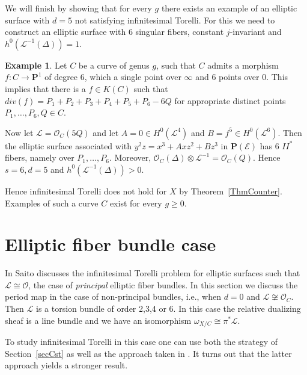 \documentclass{amsart}
\newcommand{\Ps}{\mathbf{P}}
\newcommand{\cL}{\mathcal{L}}
\newcommand{\cO}{\mathcal{O}}
\newcommand{\cE}{\mathcal{E}}
\theoremstyle{definition}
\newtheorem{example}[theorem]{Example}
\theoremstyle{remark}
\begin{document}
We will finish by showing that for every $g$ there exists an example of an elliptic surface with $d=5$ not satisfying infinitesimal Torelli. For this we need to construct an elliptic surface with  6 singular fibers, constant $j$-invariant and $h^0(\cL^{-1}(\Delta))=1$.
\begin{example}
Let $C$ be a curve of genus $g$, such that $C$ admits a morphism $f:C\to \Ps^1$ of degree $6$, which a single point over $\infty$ and $6$ points over $0$.
This implies that there is a $f\in K(C)$ such that $div(f)=P_1+P_2+P_3+P_4+P_5+P_6-6Q$ for appropriate distinct points $P_1,\dots,P_6,Q\in C$.

Now let $\cL=\cO_C(5Q)$ and let $A=0\in H^0(\cL^4)$ and $B=f^5\in H^0(\cL^6)$. Then the elliptic surface associated with $y^2z=x^3+Axz^2+Bz^3$ in $\Ps(\cE)$ has 6 $II^*$ fibers, namely over $P_1,\dots,P_6$. 
Moreover, $\cO_C(\Delta)\otimes \cL^{-1}=\cO_C(Q)$. Hence $s=6,d=5$ and $h^0(\cL^{-1}(\Delta))>0$. 

Hence infinitesimal Torelli does not hold for $X$ by Theorem~\ref{ThmCounter}. Examples of such a curve $C$ exist for every $g\geq 0$.
\end{example}

 
 

\section{Elliptic fiber bundle case}\label{secFiber}
In \cite[Section 7]{Sai} Saito discusses the infinitesimal Torelli problem for elliptic surfaces such that $\cL\cong \cO$, the case of \emph{principal} elliptic fiber bundles. 
In this section we discuss the period map in the case of non-principal bundles, i.e., when $d=0$ and  $\cL\not \cong \cO_C$. Then $\cL$ is a torsion bundle of order 2,3,4 or 6.
In this case  the relative dualizing sheaf is a line bundle and  we have an isomorphism $\omega_{X/C}\cong \pi^* \cL$. 

To study infinitesimal Torelli in this case one can use both the strategy of Section~\ref{secCst} as well as the approach taken in \cite[Section 7]{Sai}. It turns out that the latter approach yields  a stronger result.
\end{document}
